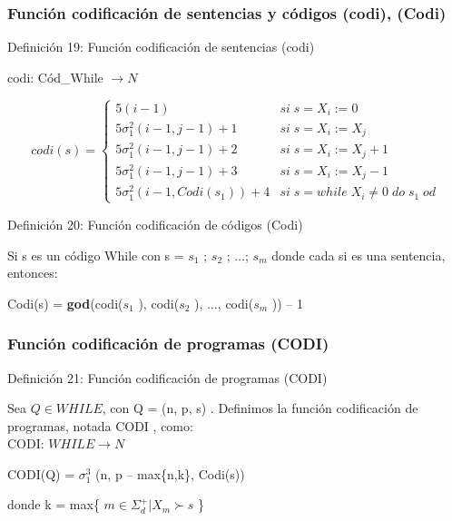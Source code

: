 \documentclass[xcolor=table]{beamer}
\begin{document}
\begin{frame}[fragile]\frametitle{Función codificación de sentencias y códigos (codi), (Codi) } \scriptsize


\begin{block}{Definición 19:  Función codificación de sentencias (codi) }
\end{block}

codi: Cód\_While $\rightarrow N$

\[codi(s) = \left\{ \begin{array}{ll} 
            5(i-1) & si\; s = X_i:=0 \\
            5 \sigma^2_1(i-1, j-1)+1 & si\; s = X_i:= X_j\\
            5 \sigma^2_1(i-1, j-1)+2 & si\; s = X_i:= X_j +1\\
            5 \sigma^2_1(i-1, j-1)+3 & si\; s = X_i:= X_j -1\\ 
            5 \sigma^2_1(i-1, Codi(s_1))+4 & si\;  s = while\; X_i \neq 0 \; do\; s_1\; od
            \end{array} \right. \]

\begin{block}{Definición 20: Función codificación de códigos (Codi)  }
\end{block}

Si s es un código While con s = $s_1$ ; $s_2$ ; $\ldots$; $s_m$ donde cada si es una sentencia, entonces:
\begin{center}
    Codi(s) = \textbf{god}(codi($s_1$ ), codi($s_2$ ), $\ldots$, codi($s_m$ )) – 1
\end{center}

\end{frame}


\begin{frame}[fragile]\frametitle{Función codificación de programas (CODI)} \scriptsize

\begin{block}{Definición 21:  Función codificación de programas (CODI)  }
\end{block}

Sea $Q \in WHILE$, con Q = (n, p, s) .
Definimos la función codificación de programas, notada CODI , como:\\
CODI: $WHILE \rightarrow N$
\begin{center}
CODI(Q) = $\sigma^3_1$  (n, p – max\{n,k\}, Codi(s))\\    
\end{center}


donde k = max\{ $m \in \Sigma^+_d | X_m \succ s$ \}

\end{frame}
\end{document}
